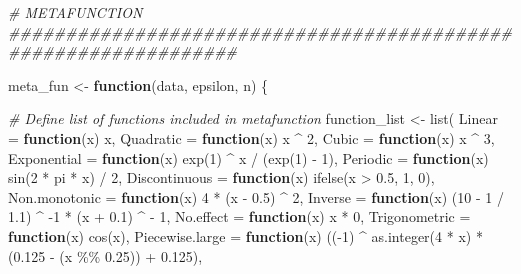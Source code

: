 \documentclass[
  11pt,
]{article}
\newenvironment{Shaded}{\begin{snugshade}}{\end{snugshade}}
\newcommand{\AttributeTok}[1]{\textcolor[rgb]{0.77,0.63,0.00}{#1}}
\newcommand{\CommentTok}[1]{\textcolor[rgb]{0.56,0.35,0.01}{\textit{#1}}}
\newcommand{\ControlFlowTok}[1]{\textcolor[rgb]{0.13,0.29,0.53}{\textbf{#1}}}
\newcommand{\DecValTok}[1]{\textcolor[rgb]{0.00,0.00,0.81}{#1}}
\newcommand{\FloatTok}[1]{\textcolor[rgb]{0.00,0.00,0.81}{#1}}
\newcommand{\FunctionTok}[1]{\textcolor[rgb]{0.00,0.00,0.00}{#1}}
\newcommand{\NormalTok}[1]{#1}
\newcommand{\OtherTok}[1]{\textcolor[rgb]{0.56,0.35,0.01}{#1}}
\newcommand{\SpecialCharTok}[1]{\textcolor[rgb]{0.00,0.00,0.00}{#1}}
\begin{document}
\begin{Shaded}
\begin{Highlighting}[]
\CommentTok{\# METAFUNCTION \#\#\#\#\#\#\#\#\#\#\#\#\#\#\#\#\#\#\#\#\#\#\#\#\#\#\#\#\#\#\#\#\#\#\#\#\#\#\#\#\#\#\#\#\#\#\#\#\#\#\#\#\#\#\#\#\#\#\#\#\#\#\#\#}

\NormalTok{meta\_fun }\OtherTok{\textless{}{-}} \ControlFlowTok{function}\NormalTok{(data, epsilon, n) \{}

  \CommentTok{\# Define list of functions included in metafunction}
\NormalTok{  function\_list }\OtherTok{\textless{}{-}} \FunctionTok{list}\NormalTok{(}
    \AttributeTok{Linear =} \ControlFlowTok{function}\NormalTok{(x) x,}
    \AttributeTok{Quadratic =} \ControlFlowTok{function}\NormalTok{(x) x }\SpecialCharTok{\^{}} \DecValTok{2}\NormalTok{,}
    \AttributeTok{Cubic =} \ControlFlowTok{function}\NormalTok{(x) x }\SpecialCharTok{\^{}} \DecValTok{3}\NormalTok{,}
    \AttributeTok{Exponential =} \ControlFlowTok{function}\NormalTok{(x) }\FunctionTok{exp}\NormalTok{(}\DecValTok{1}\NormalTok{) }\SpecialCharTok{\^{}}\NormalTok{ x }\SpecialCharTok{/}\NormalTok{ (}\FunctionTok{exp}\NormalTok{(}\DecValTok{1}\NormalTok{) }\SpecialCharTok{{-}} \DecValTok{1}\NormalTok{),}
    \AttributeTok{Periodic =} \ControlFlowTok{function}\NormalTok{(x) }\FunctionTok{sin}\NormalTok{(}\DecValTok{2} \SpecialCharTok{*}\NormalTok{ pi }\SpecialCharTok{*}\NormalTok{ x) }\SpecialCharTok{/} \DecValTok{2}\NormalTok{,}
    \AttributeTok{Discontinuous =} \ControlFlowTok{function}\NormalTok{(x) }\FunctionTok{ifelse}\NormalTok{(x }\SpecialCharTok{\textgreater{}} \FloatTok{0.5}\NormalTok{, }\DecValTok{1}\NormalTok{, }\DecValTok{0}\NormalTok{),}
    \AttributeTok{Non.monotonic =} \ControlFlowTok{function}\NormalTok{(x) }\DecValTok{4} \SpecialCharTok{*}\NormalTok{ (x }\SpecialCharTok{{-}} \FloatTok{0.5}\NormalTok{) }\SpecialCharTok{\^{}} \DecValTok{2}\NormalTok{,}
    \AttributeTok{Inverse =} \ControlFlowTok{function}\NormalTok{(x) (}\DecValTok{10} \SpecialCharTok{{-}} \DecValTok{1} \SpecialCharTok{/} \FloatTok{1.1}\NormalTok{) }\SpecialCharTok{\^{}} \SpecialCharTok{{-}}\DecValTok{1} \SpecialCharTok{*}\NormalTok{ (x }\SpecialCharTok{+} \FloatTok{0.1}\NormalTok{) }\SpecialCharTok{\^{}} \SpecialCharTok{{-}} \DecValTok{1}\NormalTok{,}
    \AttributeTok{No.effect =} \ControlFlowTok{function}\NormalTok{(x) x }\SpecialCharTok{*} \DecValTok{0}\NormalTok{,}
    \AttributeTok{Trigonometric =} \ControlFlowTok{function}\NormalTok{(x) }\FunctionTok{cos}\NormalTok{(x),}
    \AttributeTok{Piecewise.large =} \ControlFlowTok{function}\NormalTok{(x) ((}\SpecialCharTok{{-}}\DecValTok{1}\NormalTok{) }\SpecialCharTok{\^{}} \FunctionTok{as.integer}\NormalTok{(}\DecValTok{4} \SpecialCharTok{*}\NormalTok{ x) }\SpecialCharTok{*}\NormalTok{ (}\FloatTok{0.125} \SpecialCharTok{{-}}\NormalTok{ (x }\SpecialCharTok{\%\%} \FloatTok{0.25}\NormalTok{)) }\SpecialCharTok{+} \FloatTok{0.125}\NormalTok{),}

\end{Highlighting}
\end{Shaded}
\end{document}

